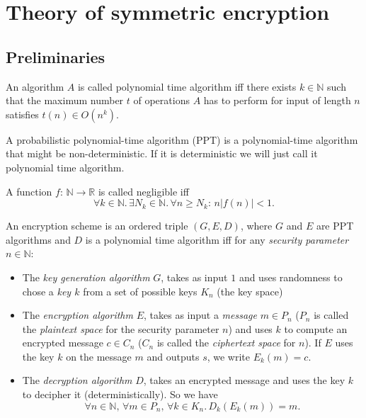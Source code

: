 \section{Theory of symmetric encryption}
\subsection{Preliminaries}
\begin{definition}
 An algorithm $A$ is called polynomial time algorithm iff there exists $k\in \mathbb{N}$ such that the maximum number $t$ of operations $A$ has to perform for input of length $n$ satisfies $t(n)\in O(n^k)$.
\end{definition}
\begin{definition}
 A probabilistic polynomial-time algorithm (PPT) is a polynomial-time algorithm that might be non-deterministic. If it is deterministic we will just call it polynomial time algorithm.
\end{definition}
\begin{definition}
 A function $f:\,\mathbb{N}\to\mathbb{R}$ is called negligible iff $$\forall k\in\mathbb{N}.\,\exists N_k\in\mathbb{N}.\,\forall n\geq N_k:\,n\left|f(n)\right|<1.$$
\end{definition}
\begin{definition}
 An encryption scheme is an ordered triple $(G, E, D)$, where $G$ and $E$ are PPT algorithms and $D$ is a polynomial time algorithm iff for any \emph{security parameter} $n\in\mathbb{N}$:
 \begin{itemize}
  \item The \emph{key generation algorithm} $G$, takes as input $1$ and uses randomness to chose a \emph{key $k$} from a set of possible keys $K_n$ (the key space)
  \item The \emph{encryption algorithm} $E$, takes as input a \emph{message} $m\in P_n$ ($P_n$ is called the \emph{plaintext space} for the security parameter $n$) and uses $k$ to compute an encrypted message $c\in C_n$ ($C_n$ is called the \emph{ciphertext space} for $n$). If $E$ uses the key $k$ on the message $m$ and outputs $s$, we write $E_k(m)=c$.
  \item The \emph{decryption algorithm} $D$, takes an encrypted message and uses the key $k$ to decipher it (deterministically). So we have $$\forall n\in\mathbb{N},\,\forall m\in P_n,\,\forall k \in K_n.\,D_k(E_k(m))=m.$$
 \end{itemize}
\end{definition}
